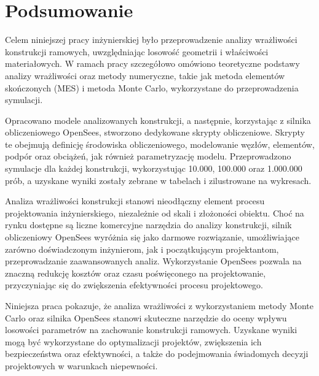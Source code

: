 \section{Podsumowanie}

Celem niniejszej pracy inżynierskiej było przeprowadzenie analizy wrażliwości konstrukcji ramowych, uwzględniając losowość geometrii i właściwości materiałowych.
W ramach pracy szczegółowo omówiono teoretyczne podstawy analizy wrażliwości oraz metody numeryczne, takie jak metoda elementów skończonych (MES) i metoda Monte Carlo, wykorzystane do przeprowadzenia symulacji.

Opracowano modele analizowanych konstrukcji, a następnie, korzystając z silnika obliczeniowego OpenSees, stworzono dedykowane skrypty obliczeniowe.
Skrypty te obejmują definicję środowiska obliczeniowego, modelowanie węzłów, elementów, podpór oraz obciążeń, jak również parametryzację modelu.
Przeprowadzono symulacje dla każdej konstrukcji, wykorzystując 10.000, 100.000 oraz 1.000.000 prób, a uzyskane wyniki zostały zebrane w tabelach i zilustrowane na wykresach.

Analiza wrażliwości konstrukcji stanowi nieodłączny element procesu projektowania inżynierskiego, niezależnie od skali i złożoności obiektu.
Choć na rynku dostępne są liczne komercyjne narzędzia do analizy konstrukcji, silnik obliczeniowy OpenSees wyróżnia się jako darmowe rozwiązanie, umożliwiające zarówno doświadczonym inżynierom, jak i początkującym projektantom, przeprowadzanie zaawansowanych analiz.
Wykorzystanie OpenSees pozwala na znaczną redukcję kosztów oraz czasu poświęconego na projektowanie, przyczyniając się do zwiększenia efektywności procesu projektowego.

Niniejsza praca pokazuje, że analiza wrażliwości z wykorzystaniem metody Monte Carlo oraz silnika OpenSees stanowi skuteczne narzędzie do oceny wpływu losowości parametrów na zachowanie konstrukcji ramowych.
Uzyskane wyniki mogą być wykorzystane do optymalizacji projektów, zwiększenia ich bezpieczeństwa oraz efektywności, a także do podejmowania świadomych decyzji projektowych w warunkach niepewności.